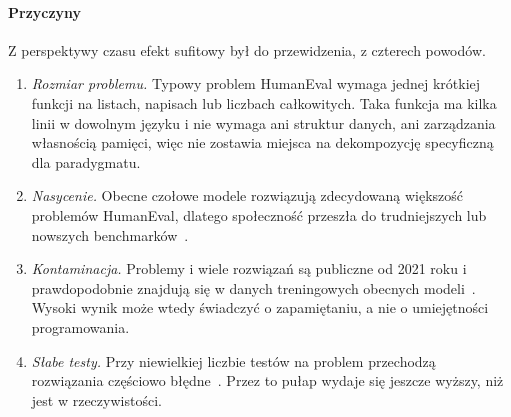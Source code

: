 \paragraph{Przyczyny} Z perspektywy czasu efekt sufitowy był do przewidzenia, z czterech powodów.
\begin{enumerate}
  \item \emph{Rozmiar problemu.} Typowy problem HumanEval wymaga jednej krótkiej funkcji na
    listach, napisach lub liczbach całkowitych. Taka funkcja ma kilka linii w dowolnym języku i nie
    wymaga ani struktur danych, ani zarządzania własnością pamięci, więc nie zostawia miejsca na
    dekompozycję specyficzną dla paradygmatu.
  \item \emph{Nasycenie.} Obecne czołowe modele rozwiązują zdecydowaną większość problemów
    HumanEval, dlatego społeczność przeszła do trudniejszych lub nowszych
    benchmarków~\cite{liu2023evalplus,jain2024livecodebench,jimenez2024swebench}.
  \item \emph{Kontaminacja.} Problemy i wiele rozwiązań są publiczne od 2021 roku i prawdopodobnie
    znajdują się w danych treningowych obecnych modeli~\cite{riddell2024contamination}. Wysoki wynik
    może wtedy świadczyć o zapamiętaniu, a nie o umiejętności programowania.
  \item \emph{Słabe testy.} Przy niewielkiej liczbie testów na problem przechodzą rozwiązania
    częściowo błędne~\cite{liu2023evalplus}. Przez to pułap wydaje się jeszcze wyższy, niż jest
    w rzeczywistości.
\end{enumerate}

